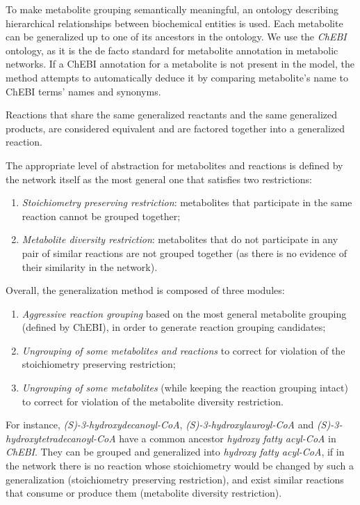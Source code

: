 \documentclass{bmcart}
\begin{document}
To make metabolite grouping semantically meaningful, an ontology describing hierarchical relationships between biochemical entities is used. Each metabolite can be generalized up to one of its ancestors in the ontology. We use the \textit{ChEBI} ontology, as it is the de facto standard for metabolite annotation in metabolic networks. If a ChEBI annotation for a metabolite is not present in the model, the method attempts to automatically deduce it by comparing metabolite's name to ChEBI terms' names and synonyms. 

Reactions that share the same generalized reactants and the same generalized products, are considered equivalent and are factored together into a generalized reaction. 

The appropriate level of abstraction for metabolites and reactions is defined by the network itself as the most general one that satisfies two restrictions: 
\begin{enumerate}
 \item \emph{Stoichiometry preserving restriction}: metabolites that participate in the same reaction cannot be grouped together;
 \item \emph{Metabolite diversity restriction}: metabolites that do not participate in any pair of similar reactions are not grouped together (as there is no evidence of their similarity in the network).
\end{enumerate}

Overall, the generalization method is composed of three modules: 
\begin{enumerate}
\item \emph{Aggressive reaction grouping} based on the most general metabolite grouping (defined by ChEBI), in order to generate reaction grouping candidates;
\item \emph{Ungrouping of some metabolites and reactions} to correct for violation of the stoichiometry preserving restriction;
\item \emph{Ungrouping of some metabolites} (while keeping the reaction grouping intact) to correct for violation of the metabolite diversity restriction.
\end{enumerate} 

For instance, \textit{(S)-3-hydroxydecanoyl-CoA}, \textit{(S)-3-hydroxylauroyl-CoA} and \textit{(S)-3-hydroxytetradecanoyl-CoA} have a common ancestor \textit{hydroxy fatty acyl-CoA} in \textit{ChEBI}. They can be grouped and generalized into \textit{hydroxy fatty acyl-CoA}, if in the network there is no reaction whose stoichiometry would be changed by such a generalization (stoichiometry preserving restriction), and exist similar reactions that consume or produce them (metabolite diversity restriction).
\end{document}
